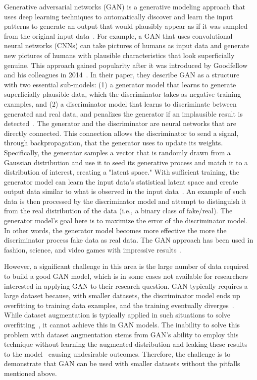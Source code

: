 \documentclass{report}
\begin{document}
Generative adversarial networks (GAN) is a generative modeling approach that uses deep learning techniques to automatically discover and learn the input patterns to generate an output that would plausibly appear as if it was sampled from the original input data~\cite{goodfellow2014generative}. For example, a GAN that uses convolutional neural networks (CNNs) can take pictures of humans as input data and generate new pictures of humans with plausible characteristics that look superficially genuine. This approach gained popularity after it was introduced by Goodfellow and his colleagues in 2014~\cite{goodfellow2014generative}. In their paper, they describe GAN as a structure with two essential sub-models: (1) a generator model that learns to generate superficially plausible data, which the discriminator takes as negative training examples, and (2) a discriminator model that learns to discriminate between generated and real data, and penalizes the generator if an implausible result is detected~\cite{creswell2018generative}. The generator and the discriminator are neural networks that are directly connected. This connection allows the discriminator to send a signal, through backpropagation, that the generator uses to update its weights. Specifically, the generator samples a vector that is randomly drawn from a Gaussian distribution and use it to seed its generative process and match it to a distribution of interest, creating a "latent space." With sufficient training, the generator model can learn the input data's statistical latent space and create output data similar to what is observed in the input data~\cite{radford2015unsupervised}. An example of such data is then processed by the discriminator model and attempt to distinguish it from the real distribution of the data (i.e., a binary class of fake/real). The generator model's goal here is to maximize the error of the discriminator model. In other words, the generator model becomes more effective the more the discriminator process fake data as real data. The GAN approach has been used in fashion, science, and video games with impressive results~\cite{gui2020review}.

However, a significant challenge in this area is the large number of data required to build a good GAN model, which is in some cases not available for researchers interested in applying GAN to their research question. GAN typically requires a large dataset because, with smaller datasets, the discriminator model ends up overfitting to training data examples, and the training eventually diverges~\cite{zhao2020improved}. While dataset augmentation is typically applied in such situations to solve overfitting~\cite{shorten2019survey}, it cannot achieve this in GAN models. The inability to solve this problem with dataset augmentation stems from GAN's ability to employ this technique without learning the augmented distribution and leaking these results to the model~\cite{zhao2020improved} causing undesirable outcomes. Therefore, the challenge is to demonstrate that GAN can be used with smaller datasets without the pitfalls mentioned above.
\end{document}
